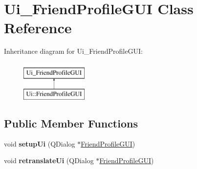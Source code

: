 \hypertarget{classUi__FriendProfileGUI}{}\section{Ui\+\_\+\+Friend\+Profile\+G\+UI Class Reference}
\label{classUi__FriendProfileGUI}
Inheritance diagram for Ui\+\_\+\+Friend\+Profile\+G\+UI\+:\begin{figure}[H]
\begin{center}
\leavevmode
\includegraphics[height=2.000000cm]{classUi__FriendProfileGUI}
\end{center}
\end{figure}
\subsection*{Public Member Functions}
\begin{DoxyCompactItemize}
\item 
void {\bfseries setup\+Ui} (Q\+Dialog $\ast$\hyperlink{classFriendProfileGUI}{Friend\+Profile\+G\+UI})\hypertarget{classUi__FriendProfileGUI_a09767f39f950876b3efb0673073fc46d}{}\label{classUi__FriendProfileGUI_a09767f39f950876b3efb0673073fc46d}

\item 
void {\bfseries retranslate\+Ui} (Q\+Dialog $\ast$\hyperlink{classFriendProfileGUI}{Friend\+Profile\+G\+UI})\hypertarget{classUi__FriendProfileGUI_a96074192bd0c6bebd7b195c5dbd9347e}{}\label{classUi__FriendProfileGUI_a96074192bd0c6bebd7b195c5dbd9347e}

\end{DoxyCompactItemize}
